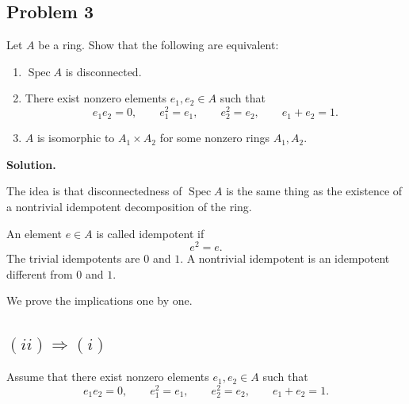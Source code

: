 
\subsection*{Problem 3}
	
	Let \(A\) be a ring. Show that the following are equivalent:
	
	\begin{enumerate}[label=\roman*)]
		\item \(\operatorname{Spec} A\) is disconnected.
		
		\item There exist nonzero elements \(e_1,e_2\in A\) such that
		\[
		e_1e_2=0,
		\qquad
		e_1^2=e_1,
		\qquad
		e_2^2=e_2,
		\qquad
		e_1+e_2=1.
		\]
		
		\item \(A\) is isomorphic to \(A_1\times A_2\) for some nonzero rings
		\(A_1,A_2\).
	\end{enumerate}
	
	\bigskip
	
	\textbf{Solution.}
	
	The idea is that disconnectedness of \(\operatorname{Spec} A\) is the same thing as the
	existence of a nontrivial idempotent decomposition of the ring.
	
	An element \(e\in A\) is called idempotent if
	\[
	e^2=e.
	\]
	The trivial idempotents are \(0\) and \(1\). A nontrivial idempotent is an
	idempotent different from \(0\) and \(1\).
	
	We prove the implications one by one.
	
	\subsection*{\((ii)\Rightarrow(i)\)}
	
	Assume that there exist nonzero elements \(e_1,e_2\in A\) such that
	\[
	e_1e_2=0,
	\qquad
	e_1^2=e_1,
	\qquad
	e_2^2=e_2,
	\qquad
	e_1+e_2=1.
	\]
	
